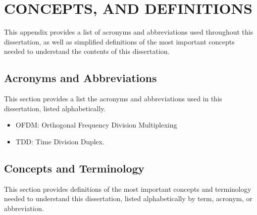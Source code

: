 
%
%

\chapter{CONCEPTS, AND DEFINITIONS}
This appendix provides a list of acronyms and abbreviations used throughout this dissertation, as well as simplified definitions of the most important concepts needed to understand the contents of
this dissertation.
\section{Acronyms and Abbreviations}
This section provides a list the acronyms and abbreviations used in this dissertation,
listed alphabetically.
\begin{itemize}

\item OFDM: Orthogonal Frequency Division Multiplexing

\item TDD: Time Division Duplex.

\end{itemize}

\section{Concepts and Terminology}
This section provides definitions of the most important concepts and terminology
needed to understand this dissertation, listed alphabetically by term, acronym,
or abbreviation.

